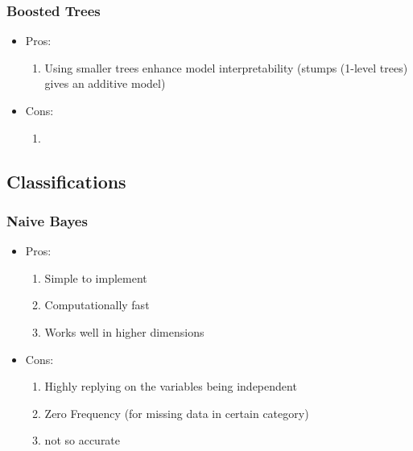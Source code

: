 \documentclass[12pt]{amsart}
\numberwithin{equation}{section}
\theoremstyle{plain}
\theoremstyle{definition}
\begin{document}
\subsubsection{Boosted Trees}

\begin{itemize}
\item Pros: 

\begin{enumerate}
\item Using smaller trees enhance model interpretability (stumps (1-level trees) gives an additive model)
\end{enumerate}

\item Cons:

\begin{enumerate}
\item
\end{enumerate}

\end{itemize}


\subsection{Classifications}

\subsubsection{Naive Bayes}

\begin{itemize}
\item Pros: 

\begin{enumerate}
\item Simple to implement
\item Computationally fast
\item Works well in higher dimensions
\end{enumerate}

\item Cons:

\begin{enumerate}
\item Highly replying on the variables being independent
\item Zero Frequency (for missing data in certain category)
\item not so accurate
\end{enumerate}

\end{itemize}
\end{document}
